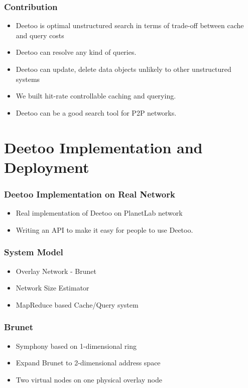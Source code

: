 \documentclass[red]{beamer}
\begin{document}
\begin{frame}
\frametitle{Contribution}

\begin{itemize}
\item
Deetoo is optimal unstructured search in terms of trade-off between cache and query costs  
\item
Deetoo can resolve any kind of queries.
\item Deetoo can update, delete data objects unlikely to other unstructured systems
\item
We built hit-rate controllable caching and querying.
\item
Deetoo can be a good search tool for P2P networks.
\end{itemize}
\end{frame}

\section{Deetoo Implementation and Deployment}
\begin{frame}
\frametitle{Deetoo Implementation on Real Network}
\begin{itemize}
\item Real implementation of Deetoo on PlanetLab network
\item Writing an API to make it easy for people to use Deetoo.
\end{itemize}
\end{frame}

\begin{frame}
\frametitle{System Model}
\begin{itemize}
\item Overlay Network - Brunet
\item Network Size Estimator
\item MapReduce based Cache/Query system
\end{itemize}
\end{frame}

\begin{frame}
\frametitle{Brunet}
\begin{itemize}
\item Symphony based on 1-dimensional ring 
\item Expand Brunet to 2-dimensional address space
\item Two virtual nodes on one physical overlay node
\end{itemize}
\end{frame}
\end{document}
